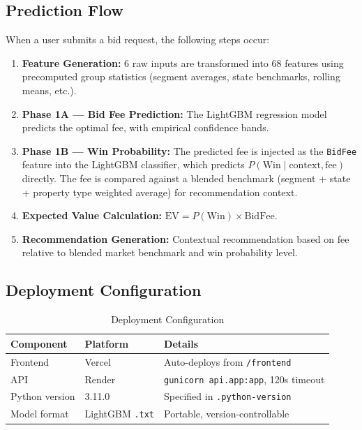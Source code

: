 \documentclass[12pt,a4paper]{article}
\begin{document}
\subsection{Prediction Flow}

When a user submits a bid request, the following steps occur:

\begin{enumerate}[nosep]
    \item \textbf{Feature Generation:} 6 raw inputs are transformed into 68 features using precomputed group statistics (segment averages, state benchmarks, rolling means, etc.).
    \item \textbf{Phase 1A --- Bid Fee Prediction:} The LightGBM regression model predicts the optimal fee, with empirical confidence bands.
    \item \textbf{Phase 1B --- Win Probability:} The predicted fee is injected as the \texttt{BidFee} feature into the LightGBM classifier, which predicts $P(\text{Win} \mid \text{context}, \text{fee})$ directly. The fee is compared against a blended benchmark (segment + state + property type weighted average) for recommendation context.
    \item \textbf{Expected Value Calculation:} $\text{EV} = P(\text{Win}) \times \text{BidFee}$.
    \item \textbf{Recommendation Generation:} Contextual recommendation based on fee relative to blended market benchmark and win probability level.
\end{enumerate}

\subsection{Deployment Configuration}

\begin{table}[H]
\centering
\caption{Deployment Configuration}
\label{tab:deployment}
\begin{tabular}{lll}
\toprule
\textbf{Component} & \textbf{Platform} & \textbf{Details} \\
\midrule
Frontend & Vercel & Auto-deploys from \texttt{/frontend} \\
API & Render & \texttt{gunicorn api.app:app}, 120s timeout \\
Python version & 3.11.0 & Specified in \texttt{.python-version} \\
Model format & LightGBM \texttt{.txt} & Portable, version-controllable \\
\bottomrule
\end{tabular}
\end{table}
\end{document}

